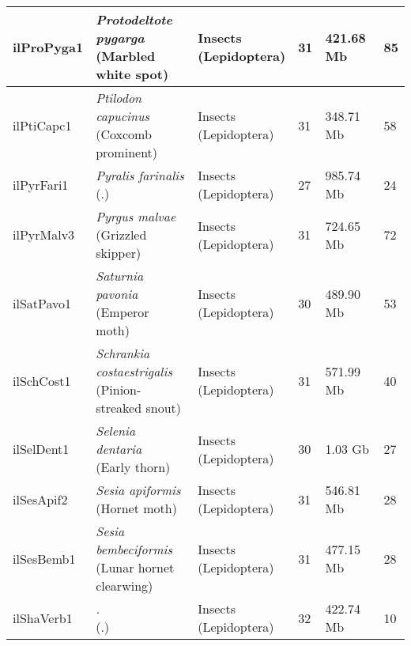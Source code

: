 \begin{centering}
\begin{longtable}{l|l|l|l|l|l}
ilProPyga1 & \makecell[{l}]{\textit{Protodeltote pygarga} \\ (Marbled white spot)} & \makecell[{l}]{Insects \\ (Lepidoptera)} & 31 & 421.68 Mb & 85  \\ \hline
ilPtiCapc1 & \makecell[{l}]{\textit{Ptilodon capucinus} \\ (Coxcomb prominent)} & \makecell[{l}]{Insects \\ (Lepidoptera)} & 31 & 348.71 Mb & 58  \\ \hline
ilPyrFari1 & \makecell[{l}]{\textit{Pyralis farinalis} \\ (.)} & \makecell[{l}]{Insects \\ (Lepidoptera)} & 27 & 985.74 Mb & 24  \\ \hline
ilPyrMalv3 & \makecell[{l}]{\textit{Pyrgus malvae} \\ (Grizzled skipper)} & \makecell[{l}]{Insects \\ (Lepidoptera)} & 31 & 724.65 Mb & 72  \\ \hline
ilSatPavo1 & \makecell[{l}]{\textit{Saturnia pavonia} \\ (Emperor moth)} & \makecell[{l}]{Insects \\ (Lepidoptera)} & 30 & 489.90 Mb & 53  \\ \hline
ilSchCost1 & \makecell[{l}]{\textit{Schrankia costaestrigalis} \\ (Pinion-streaked snout)} & \makecell[{l}]{Insects \\ (Lepidoptera)} & 31 & 571.99 Mb & 40  \\ \hline
ilSelDent1 & \makecell[{l}]{\textit{Selenia dentaria} \\ (Early thorn)} & \makecell[{l}]{Insects \\ (Lepidoptera)} & 30 & 1.03 Gb & 27  \\ \hline
ilSesApif2 & \makecell[{l}]{\textit{Sesia apiformis} \\ (Hornet moth)} & \makecell[{l}]{Insects \\ (Lepidoptera)} & 31 & 546.81 Mb & 28  \\ \hline
ilSesBemb1 & \makecell[{l}]{\textit{Sesia bembeciformis} \\ (Lunar hornet clearwing)} & \makecell[{l}]{Insects \\ (Lepidoptera)} & 31 & 477.15 Mb & 28  \\ \hline
ilShaVerb1 & \makecell[{l}]{\textit{.} \\ (.)} & \makecell[{l}]{Insects \\ (Lepidoptera)} & 32 & 422.74 Mb & 10  \\ \hline

\end{longtable}
\end{centering}
